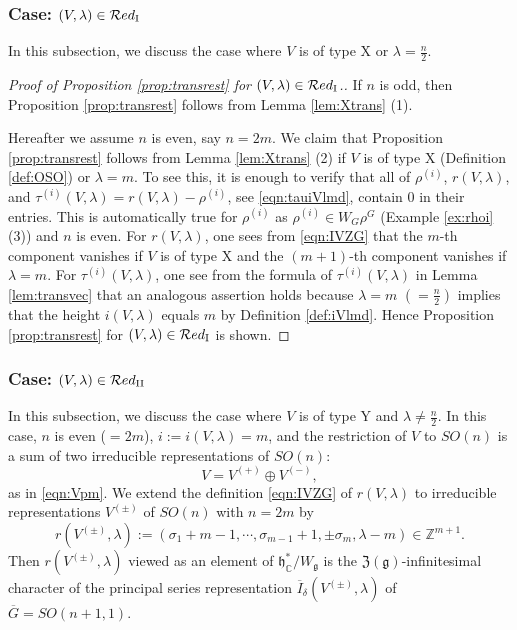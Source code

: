 \subsubsection{Case: $(V,\lambda) \in {\mathcal{R}}ed_{\operatorname{I}}$}
In this subsection,
 we discuss the case 
 where $V$ is of type X
 or $\lambda=\frac n 2$.  
\begin{proof}
[Proof of Proposition \ref{prop:transrest} for $(V,\lambda) \in {\mathcal{R}}ed_{\operatorname{I}}$.]
If $n$ is odd, 
 then Proposition \ref{prop:transrest}
 follows from Lemma \ref{lem:Xtrans} (1).  


Hereafter we assume $n$ is even, 
 say $n=2m$.  
We claim 
 that Proposition \ref{prop:transrest} follows from
 Lemma \ref{lem:Xtrans} (2)
 if $V$ is of type X
 (Definition \ref{def:OSO})
 or $\lambda=m$.  
To see this, 
 it is enough 
 to verify 
 that all of $\rho^{(i)}$, 
 $r(V,\lambda)$, 
 and $\tau^{(i)}(V,\lambda)=r(V,\lambda)-\rho^{(i)}$, 
 see \eqref{eqn:tauiVlmd}, 
 contain 0
 in their entries.  
This is automatically true
 for $\rho^{(i)}$ as $\rho^{(i)} \in W_G \rho^G$
 (Example \ref{ex:rhoi} (3))
 and $n$ is even.  
For $r(V,\lambda)$, 
 one sees from \eqref{eqn:IVZG} 
 that the $m$-th component vanishes
 if $V$ is of type X
 and the $(m+1)$-th component vanishes
 if $\lambda=m$.  
For $\tau^{(i)}(V,\lambda)$, 
 one see from the formula 
 of $\tau^{(i)}(V,\lambda)$
in Lemma \ref{lem:transvec}
 that an analogous assertion holds
 because $\lambda=m$ $(=\frac n 2)$ implies
 that the height $i(V,\lambda)$ equals $m$
 by Definition \ref{def:iVlmd}.  
Hence Proposition \ref{prop:transrest}
 for $(V,\lambda) \in {\mathcal{R}}ed_{\operatorname{I}}$ is shown.  
\end{proof}


\subsubsection{Case: $(V,\lambda) \in {\mathcal{R}}ed_{\operatorname{I I}}$}

In this subsection, 
 we discuss the case 
 where $V$ is of type Y and $\lambda \ne \frac n2$.  
In this case, 
 $n$ is even ($=2m$), 
 $i:=i(V,\lambda)=m$,  
 and the restriction of $V$ to $SO(n)$
 is a sum of two irreducible representations of $SO(n)$:
\[
  V=V^{(+)} \oplus V^{(-)}, 
\]
as in \eqref{eqn:Vpm}.  
We extend the definition \eqref{eqn:IVZG}
 of $r(V,\lambda)$ 
 to irreducible representations $V^{(\pm)}$ of $SO(n)$
 with $n=2m$ by 
\[
  r(V^{(\pm)},\lambda):=(\sigma_1+m-1,\cdots, \sigma_{m-1}+1, \pm \sigma_m, \lambda-m) \in {\mathbb{Z}}^{m+1}.  
\]
Then $r(V^{(\pm)}, \lambda)$ viewed as an element of ${\mathfrak{h}}_{\mathbb{C}}^{\ast}/W_{{\mathfrak{g}}}$ 
 is the ${\mathfrak{Z}}({\mathfrak{g}})$-infinitesimal character
 of the principal series representation
 $\overline I_{\delta}(V^{(\pm)},\lambda)$
 of $\overline G=SO(n+1,1)$.  



